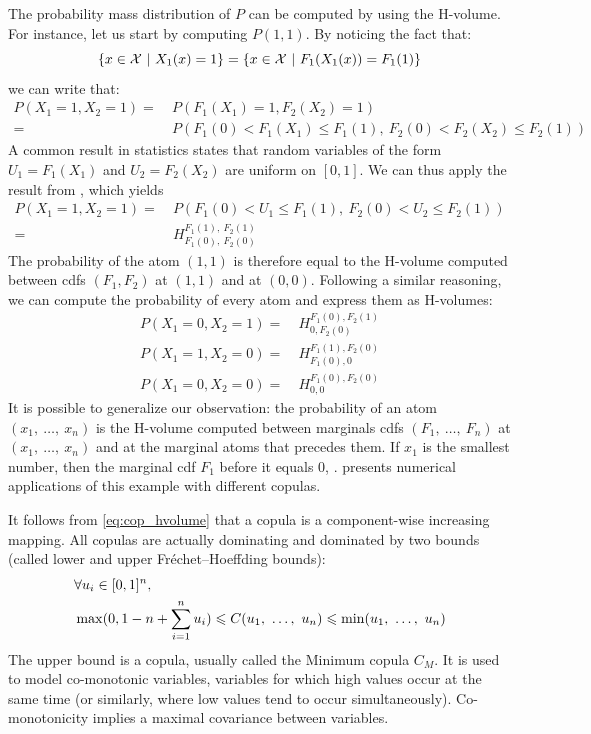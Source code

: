 \begin{example}
    The probability mass distribution of $P$ can be computed by using the H-volume. For instance, let us start by computing $P(1,1)$. By noticing the fact that:
    \begin{equation*}
        \{x\in\mathcal{X}~|~X_1(x)=1\}=\{x\in\mathcal{X}~|~F_1(X_1(x))=F_1(1)\}
    \end{equation*}
    we can write that:
    \begin{align*}
        P(X_1 = 1, X_2=1) =& ~P(F_1(X_1)= 1, F_2(X_2) = 1)\\
        =& ~P(F_1(0) < F_1(X_1)\leqslant F_1(1), ~F_2(0) < F_2(X_2)\leqslant F_2(1))
    \end{align*}
    A common result in statistics states that random variables of the form $U_1=F_1(X_1)$ and $U_2=F_2(X_2)$ are uniform on $[0,1]$. We can thus apply the result from , which yields
    \begin{align*}
        P(X_1 = 1, X_2=1) =& ~P(F_1(0) < U_1 \leqslant F_1(1), ~F_2(0) < U_2 \leqslant F_2(1))\\
        =& ~H^{F_1(1),~F_2(1)}_{F_1(0),~F_2(0)}
    \end{align*}
    The probability of the atom $(1,1)$ is therefore equal to the H-volume computed between \acrshort{cdf}s $(F_1, F_2)$ at $(1, 1)$ and at $(0,0)$. Following a similar reasoning, we can compute the probability of every atom and express them as H-volumes:
    \begin{align*}
        P(X_1=0, X_2=1) =& ~H_{0, F_2(0)}^{F_1(0), F_2(1)}\\
        P(X_1=1, X_2=0) =& ~H_{F_1(0), 0}^{F_1(1), F_2(0)}\\
        P(X_1=0, X_2=0) =& ~H_{0,0}^{F_1(0), F_2(0)}
    \end{align*}
    It is possible to generalize our observation: the probability of an atom $(x_1,~\ldots,~x_n)$ is the H-volume computed between marginals \acrshort{cdf}s $(F_1,~\ldots,~F_n)$ at $(x_1,~\ldots,~x_n)$ and at the marginal atoms that precedes them. If $x_1$ is the smallest number, then the marginal \acrshort{cdf} $F_1$ before it equals $0$, \etc.
     presents numerical applications of this example with different copulas.
\end{example}

It follows from \eqref{eq:cop_hvolume} that a copula is a component-wise increasing mapping. All copulas are actually dominating and dominated by two bounds (called lower and upper Fréchet–Hoeffding bounds):
\begin{align}
    &\forall u_i \in [0,1]^n,\nonumber\\
    &\max(0, 1-n+\sum_{i=1}^n u_i) \leqslant C(u_1, ~\ldots, ~ u_n) \leqslant \min(u_1, ~\ldots, ~ u_n)
\end{align}
The upper bound is a copula, usually called the Minimum copula $C_M$. It is used to model co-monotonic variables, \ie variables for which high values occur at the same time (or similarly, where low values tend to occur simultaneously). Co-monotonicity implies a maximal covariance between variables.

